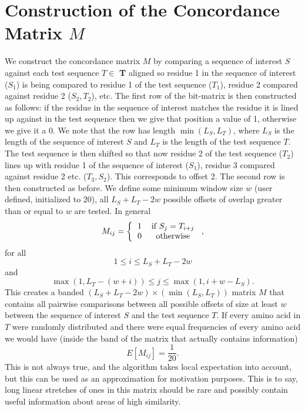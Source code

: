 \documentclass[phd,tocprelim]{cornell}
\begin{document}
\section{Construction of the Concordance Matrix $M$}

We construct the concordance matrix $M$ by comparing a sequence of interest $S$ against each test sequence $T \in$ \textbf{T} aligned so residue 1 in the sequence of interest ($S_{1}$) is being compared to residue 1 of the test sequence ($T_{1}$), residue 2 compared against residue 2 ($S_{2},T_{2}$), etc. The first row of the bit-matrix is then constructed as follows: if the residue in the sequence of interest matches the residue it is lined up against in the test sequence then we give that position a value of 1, otherwise we give it a 0. We note that the row has length $\min(L_{S},L_{T})$, where $L_{S}$ is the length of the sequence of interest $S$ and $L_{T}$ is the length of the test sequence $T$. The test sequence is then shifted so that now residue 2 of the test sequence ($T_{2}$) lines up with residue 1 of the sequence of interest ($S_{1}$), residue 3 compared against residue 2 etc. ($T_{3},S_{2}$). This corresponds to offset 2. The second row is then constructed as before. We define some minimum window size $w$ (user defined, initialized to 20), all $L_{S} + L_{T}-2w$ possible offsets of overlap greater than or equal to $w$ are tested. In general
\begin{equation}
    M_{ij} = \left\{\begin{tabular}{cc} 1 & if $S_{j} = T_{i+j}$ \\ 0 & otherwise \end{tabular}\right.,
\end{equation}
for all
\begin{equation}
    1 \leq i \leq L_{S} + L_{T}-2w
\end{equation}
and
\begin{equation}
    \max(1,L_{T} - (w+i)) \leq j \leq \max(1,i+w-L_{S}).
\end{equation}
This creates a banded $(L_{S} + L_{T}-2w) \times (\min(L_{S},L_{T}))$ matrix $M$ that contains all pairwise comparisons between all possible offsets of size at least $w$ between the sequence of interest $S$ and the test sequence $T$. If every amino acid in $T$ were randomly distributed and there were equal frequencies of every amino acid we would have (inside the band of the matrix that actually contains information)
\begin{equation}
    E[M_{ij}] = \frac{1}{20}.
\end{equation}
This is not always true, and the algorithm takes local expectation into account, but this can be used as an approximation for motivation purposes. This is to say, long linear stretches of ones in this matrix should be rare and possibly contain useful information about areas of high similarity.
\end{document}
